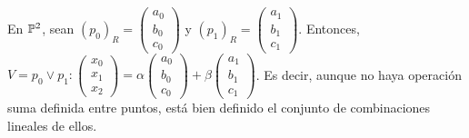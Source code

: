 \begin{obs}
    En $\mathbb{P} ^2$, sean $\left( p_0 \right)_R = \begin{pmatrix} a_0 \\ b_0 \\ c_0 \end{pmatrix}$ y $\left( p_1 \right)_R = \begin{pmatrix} a_1 \\ b_1 \\ c_1 \end{pmatrix}$. Entonces, $V=p_0 \vee p_1 \colon \begin{pmatrix} x_0 \\ x_1 \\ x_2 \end{pmatrix} = \alpha \begin{pmatrix} a_0 \\ b_0 \\ c_0 \end{pmatrix} + \beta \begin{pmatrix} a_1 \\ b_1 \\ c_1 \end{pmatrix}$.
    Es decir, aunque no haya operación suma definida entre puntos, está bien definido el conjunto de combinaciones lineales de ellos.
\end{obs}
